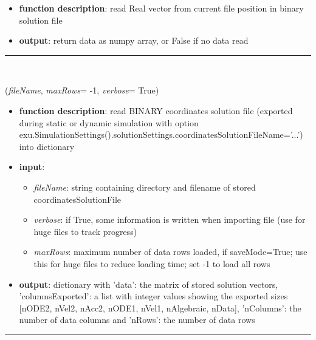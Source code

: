 \begin{itemize}[leftmargin=1.4cm]
\begin{itemize}[leftmargin=1.4cm]
\begin{itemize}[leftmargin=1.4cm]
\begin{itemize}[leftmargin=0.5cm]
\begin{itemize}[leftmargin=0.7cm]
\item[--]
{\bf function description}: read Real vector from current file position in binary solution file
\item[--]
{\bf output}: return data as numpy array, or False if no data read
\vspace{12pt}\end{itemize}
%
\noindent\rule{8cm}{0.75pt}\vspace{1pt} \\ 
\begin{flushleft}
\label{sec:basicUtilities:LoadBinarySolutionFile}
({\it fileName}, {\it maxRows}= -1, {\it verbose}= True)
\end{flushleft}
\setlength{\itemindent}{0.7cm}
\begin{itemize}[leftmargin=0.7cm]
\item[--]
{\bf function description}: read BINARY coordinates solution file (exported during static or dynamic simulation with option exu.SimulationSettings().solutionSettings.coordinatesSolutionFileName='...') into dictionary
\item[--]
{\bf input}: \vspace{-6pt}
\begin{itemize}[leftmargin=1.2cm]
\setlength{\itemindent}{-0.7cm}
\item[]{\it fileName}: string containing directory and filename of stored coordinatesSolutionFile
\item[]{\it verbose}: if True, some information is written when importing file (use for huge files to track progress)
\item[]{\it maxRows}: maximum number of data rows loaded, if saveMode=True; use this for huge files to reduce loading time; set -1 to load all rows
\end{itemize}
\item[--]
{\bf output}: dictionary with 'data': the matrix of stored solution vectors, 'columnsExported': a list with integer values showing the exported sizes [nODE2, nVel2, nAcc2, nODE1, nVel1, nAlgebraic, nData], 'nColumns': the number of data columns and 'nRows': the number of data rows
\vspace{12pt}\end{itemize}
%
\noindent\rule{8cm}{0.75pt}\vspace{1pt} \\ 
\begin{flushleft}

\end{flushleft}
\end{itemize}
\end{itemize}
\end{itemize}
\end{itemize}
